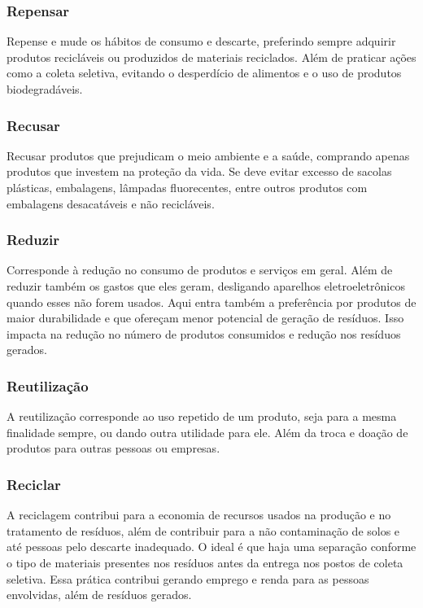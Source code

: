 \subsubsection{Repensar}
Repense e mude os hábitos de consumo e descarte, preferindo sempre adquirir produtos recicláveis ou produzidos de materiais reciclados. Além de praticar ações como a coleta seletiva, evitando o desperdício de alimentos e o uso de produtos biodegradáveis.

\subsubsection{Recusar}
Recusar produtos que prejudicam o meio ambiente e a saúde, comprando apenas produtos que investem na proteção da vida. Se deve evitar excesso de sacolas plásticas, embalagens, lâmpadas fluorecentes, entre outros produtos com embalagens desacatáveis e não recicláveis.

\subsubsection{Reduzir}
Corresponde à redução no consumo de produtos e serviços em geral. Além de reduzir também os gastos que eles geram, desligando aparelhos eletroeletrônicos quando esses não forem usados. Aqui entra também a preferência por produtos de maior durabilidade e que ofereçam menor potencial de geração de resíduos. Isso impacta na redução no número de produtos consumidos e redução nos resíduos gerados.

\subsubsection{Reutilização}
A reutilização corresponde ao uso repetido de um produto, seja para a mesma finalidade sempre, ou dando outra utilidade para ele. Além da troca e doação de produtos para outras pessoas ou empresas.

\subsubsection{Reciclar}
A reciclagem contribui para a economia de recursos usados na produção e no tratamento de resíduos, além de contribuir para a não contaminação de solos e até pessoas pelo descarte inadequado. O ideal é que haja uma separação conforme o tipo de materiais presentes nos resíduos antes da entrega nos postos de coleta seletiva. Essa prática contribui gerando emprego e renda para as pessoas envolvidas, além de resíduos gerados.


